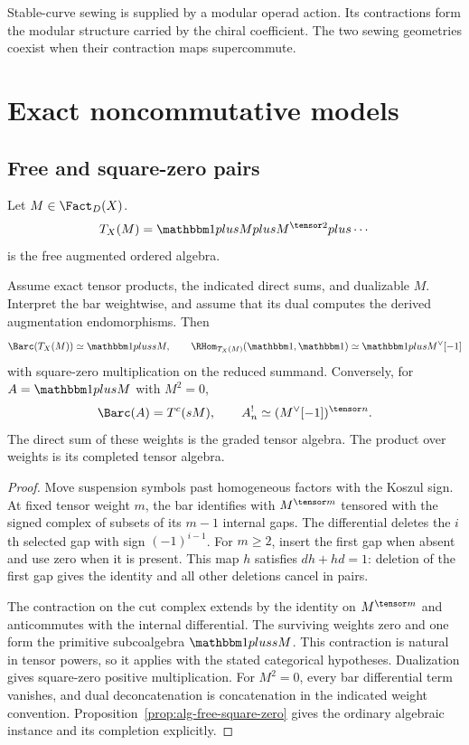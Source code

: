 Stable-curve sewing is supplied by a modular operad action. Its contractions form the modular structure carried by the chiral coefficient. The two sewing geometries coexist when their contraction maps supercommute.

\part{Exact noncommutative models}

\chapter{Free and square-zero pairs}
Let $M\in\Fact_D(X)$.
\[
 T_X(M)=\mathbbm1\oplus M\oplus M^{\tensor2}\oplus\cdots
\]
is the free augmented ordered algebra.

\begin{theorem}
Assume exact tensor products, the indicated direct sums, and dualizable $M$.
Interpret the bar weightwise, and assume that its dual computes the derived augmentation endomorphisms. Then
\[
 \Barc(T_X(M))\simeq \mathbbm1\oplus sM,
 \qquad
 \RHom_{T_X(M)}(\mathbbm1,\mathbbm1)
 \simeq \mathbbm1\oplus M^\vee[-1]
\]
with square-zero multiplication on the reduced summand.
Conversely, for $A=\mathbbm1\oplus M$ with $M^2=0$,
\[
 \Barc(A)=T^c(sM),\qquad A^!_n\simeq (M^\vee[-1])^{\tensor n}.
\]
The direct sum of these weights is the graded tensor algebra. The product over weights is its completed tensor algebra.
\end{theorem}
\begin{proof}
Move suspension symbols past homogeneous factors with the Koszul sign.
At fixed tensor weight $m$, the bar identifies with $M^{\tensor m}$ tensored with the signed complex of subsets of its $m-1$ internal gaps.
The differential deletes the $i$th selected gap with sign $(-1)^{i-1}$.
For $m\ge2$, insert the first gap when absent and use zero when it is present.
This map $h$ satisfies $dh+hd=1$: deletion of the first gap gives the identity and all other deletions cancel in pairs.

The contraction on the cut complex extends by the identity on $M^{\tensor m}$ and anticommutes with the internal differential.
The surviving weights zero and one form the primitive subcoalgebra $\mathbbm1\oplus sM$.
This contraction is natural in tensor powers, so it applies with the stated categorical hypotheses.
Dualization gives square-zero positive multiplication.
For $M^2=0$, every bar differential term vanishes, and dual deconcatenation is concatenation in the indicated weight convention.
Proposition~\ref{prop:alg-free-square-zero} gives the ordinary algebraic instance and its completion explicitly.
\end{proof}

